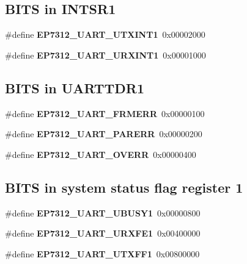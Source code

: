 \subsection*{B\+I\+TS in I\+N\+T\+S\+R1}
\begin{DoxyCompactItemize}
\item 
\mbox{\label{group__edb7312__registers_gae83d1d69dbb12b729066819e2366784c}} 
\#define {\bfseries E\+P7312\+\_\+\+U\+A\+R\+T\+\_\+\+U\+T\+X\+I\+N\+T1}~0x00002000
\item 
\mbox{\label{group__edb7312__registers_gae1358e406919f6ab6579ebf5445dc29b}} 
\#define {\bfseries E\+P7312\+\_\+\+U\+A\+R\+T\+\_\+\+U\+R\+X\+I\+N\+T1}~0x00001000
\end{DoxyCompactItemize}
\subsection*{B\+I\+TS in U\+A\+R\+T\+T\+D\+R1}
\begin{DoxyCompactItemize}
\item 
\mbox{\label{group__edb7312__registers_ga8ab4377cd6cdb6f18d5a33f8c2af8859}} 
\#define {\bfseries E\+P7312\+\_\+\+U\+A\+R\+T\+\_\+\+F\+R\+M\+E\+RR}~0x00000100
\item 
\mbox{\label{group__edb7312__registers_gad60a639e49911e53272fec784b4f4092}} 
\#define {\bfseries E\+P7312\+\_\+\+U\+A\+R\+T\+\_\+\+P\+A\+R\+E\+RR}~0x00000200
\item 
\mbox{\label{group__edb7312__registers_ga3408c4101d031ee2fa4296c2bf5e95dd}} 
\#define {\bfseries E\+P7312\+\_\+\+U\+A\+R\+T\+\_\+\+O\+V\+E\+RR}~0x00000400
\end{DoxyCompactItemize}
\subsection*{B\+I\+TS in system status flag register 1}
\begin{DoxyCompactItemize}
\item 
\mbox{\label{group__edb7312__registers_ga8f9eb565d5b854214a690a5fb563cebb}} 
\#define {\bfseries E\+P7312\+\_\+\+U\+A\+R\+T\+\_\+\+U\+B\+U\+S\+Y1}~0x00000800
\item 
\mbox{\label{group__edb7312__registers_gab6fd486fbb3c5914e28300d5d5fcbca5}} 
\#define {\bfseries E\+P7312\+\_\+\+U\+A\+R\+T\+\_\+\+U\+R\+X\+F\+E1}~0x00400000
\item 
\mbox{\label{group__edb7312__registers_gadc136afe9ea6b6198a4b1c766194bad3}} 
\#define {\bfseries E\+P7312\+\_\+\+U\+A\+R\+T\+\_\+\+U\+T\+X\+F\+F1}~0x00800000
\end{DoxyCompactItemize}
